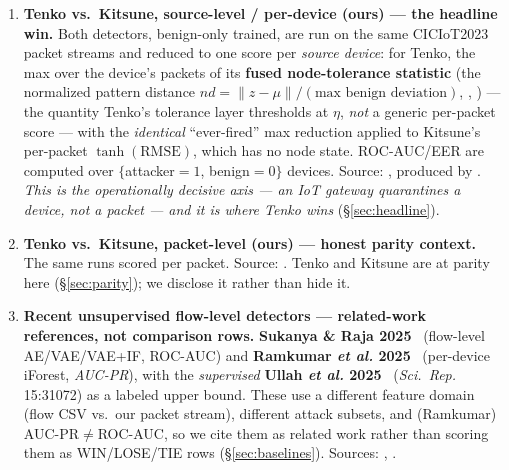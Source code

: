 \documentclass[11pt]{article}
\begin{document}
\begin{enumerate}
  \item[\textbf{(a)}] \textbf{Tenko vs.\ Kitsune, source-level / per-device (ours) --- the headline
        win.} Both detectors, benign-only trained, are run on the same CICIoT2023 packet streams and
        reduced to one score per \emph{source device}: for Tenko, the max over the device's packets
        of its \textbf{fused node-tolerance statistic} (the normalized pattern distance
        $nd=\lVert z-\mu\rVert/(\text{max benign deviation})$, ,
        ) --- the quantity Tenko's tolerance layer thresholds at $\eta$,
        \emph{not} a generic per-packet score --- with the \emph{identical} ``ever-fired'' max
        reduction applied to Kitsune's per-packet $\tanh(\mathrm{RMSE})$, which has no node state.
        ROC-AUC/EER are computed over $\{$attacker$=1$, benign$=0\}$ devices.
        Source: , produced by
        . \emph{This is the operationally decisive axis --- an
        IoT gateway quarantines a device, not a packet --- and it is where Tenko wins}
        (\S\ref{sec:headline}).
  \item[\textbf{(b)}] \textbf{Tenko vs.\ Kitsune, packet-level (ours) --- honest parity context.}
        The same runs scored per packet. Source: . Tenko
        and Kitsune are at parity here (\S\ref{sec:parity}); we disclose it rather than hide it.
  \item[\textbf{(c)}] \textbf{Recent unsupervised flow-level detectors --- related-work references,
        not comparison rows.} \textbf{Sukanya \& Raja 2025}~\cite{sukanya2025} (flow-level
        AE/VAE/VAE+IF, ROC-AUC) and \textbf{Ramkumar \emph{et al.} 2025}~\cite{ramkumar2025}
        (per-device iForest, \emph{AUC-PR}), with the \emph{supervised} \textbf{Ullah \emph{et al.}
        2025}~\cite{ullah2025} (\emph{Sci.\ Rep.} 15:31072) as a labeled upper bound. These use a
        different feature domain (flow CSV vs.\ our packet stream), different attack subsets, and
        (Ramkumar) AUC-PR${\neq}$ROC-AUC, so we cite them as related work rather than scoring them as
        WIN/LOSE/TIE rows (\S\ref{sec:baselines}). Sources: ,
        .
\end{enumerate}

\end{document}
